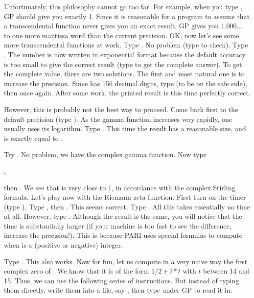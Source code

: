 Unfortunately, this philosophy cannot go too far. For example, when you
type , GP should give you exactly 1. Since it is reasonable for
a program to assume that a transcendental function never gives you an exact
result, GP gives you $1.000\dots$ to one more mantissa word than the current
precision.
\medskip
OK, now let's see some more transcendental functions at work. Type
. No problem (type  to check). Type .
The number is now written in exponential format because the default
accuracy is too small to give the correct result (type  to get the
complete answer).
To get the complete value, there are two solutions. The first and most natural
one is to increase the precision. Since  has 156 decimal
digits, type  (to be on the safe side), then 
once again. After some work, the printed result is this time perfectly
correct.

However, this is probably not the best way to proceed. Come back first to the
default precision (type ). As the gamma function increases
very rapidly, one usually uses its logarithm. Type . This
time the result has a reasonable size, and is exactly equal to .

Try . No problem, we have the complex gamma function.
Now type

,

\noindent then . We see that  is very close to 1,
in accordance with the complex Stirling formula. \smallskip
%
Let's play now with the Riemann zeta function. First turn on the timer (type
\kbd{\#}). Type , then . This seems correct. Type
. All this takes essentially no time at all. However, type
. Although the result is the same, you will notice that the
time is substantially larger (if your machine is too fast to see the
difference, increase the precision!). This is because PARI uses special
formulas to compute  when  is a (positive or negative)
integer.

Type . This also works. Now for fun, let us compute in a
very naive way the first complex zero of . We know that it is
of the form $1/2 + i*t$ with $t$ between 14 and 15. Thus, we can use the
following series of instructions. But instead of typing them directly, write
them into a file, say , then type  under GP to
read it in:

